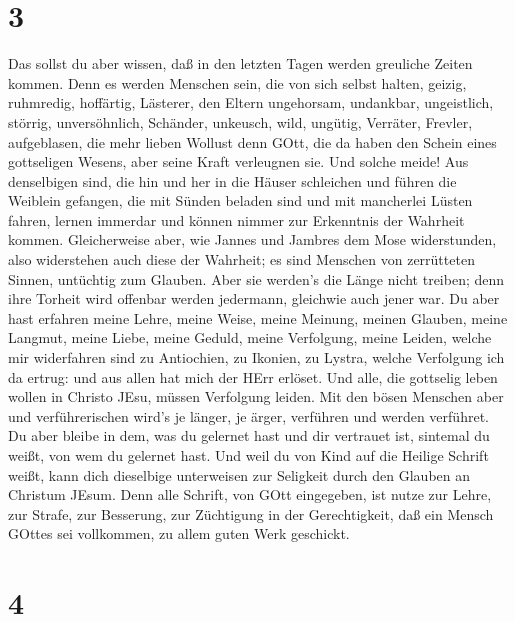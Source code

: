 \hypertarget{section-2}{%
\section{3}\label{section-2}}

 Das sollst du aber wissen, daß in den letzten Tagen werden
greuliche Zeiten kommen.  Denn es werden Menschen sein, die
von sich selbst halten, geizig, ruhmredig, hoffärtig, Lästerer, den
Eltern ungehorsam, undankbar, ungeistlich,  störrig,
unversöhnlich, Schänder, unkeusch, wild, ungütig,  Verräter,
Frevler, aufgeblasen, die mehr lieben Wollust denn GOtt, 
die da haben den Schein eines gottseligen Wesens, aber seine Kraft
verleugnen sie. Und solche meide!  Aus denselbigen sind, die
hin und her in die Häuser schleichen und führen die Weiblein gefangen,
die mit Sünden beladen sind und mit mancherlei Lüsten fahren,
 lernen immerdar und können nimmer zur Erkenntnis der
Wahrheit kommen.  Gleicherweise aber, wie Jannes und Jambres
dem Mose widerstunden, also widerstehen auch diese der Wahrheit; es sind
Menschen von zerrütteten Sinnen, untüchtig zum Glauben. 
Aber sie werden's die Länge nicht treiben; denn ihre Torheit wird
offenbar werden jedermann, gleichwie auch jener war.  Du
aber hast erfahren meine Lehre, meine Weise, meine Meinung, meinen
Glauben, meine Langmut, meine Liebe, meine Geduld,  meine
Verfolgung, meine Leiden, welche mir widerfahren sind zu Antiochien, zu
Ikonien, zu Lystra, welche Verfolgung ich da ertrug: und aus allen hat
mich der HErr erlöset.  Und alle, die gottselig leben
wollen in Christo JEsu, müssen Verfolgung leiden.  Mit den
bösen Menschen aber und verführerischen wird's je länger, je ärger,
verführen und werden verführet.  Du aber bleibe in dem, was
du gelernet hast und dir vertrauet ist, sintemal du weißt, von wem du
gelernet hast.  Und weil du von Kind auf die Heilige
Schrift weißt, kann dich dieselbige unterweisen zur Seligkeit durch den
Glauben an Christum JEsum.  Denn alle Schrift, von GOtt
eingegeben, ist nutze zur Lehre, zur Strafe, zur Besserung, zur
Züchtigung in der Gerechtigkeit,  daß ein Mensch GOttes sei
vollkommen, zu allem guten Werk geschickt.

\hypertarget{section-3}{%
\section{4}\label{section-3}}

